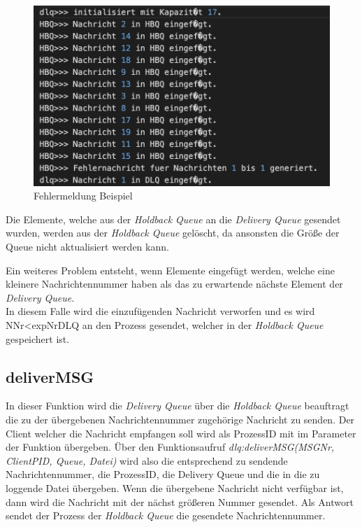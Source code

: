 \begin{figure}[htbp]
\begin{center}
\includegraphics[scale=0.6]{Bilder/BeispielHBQFehler}
\caption{\label{fig:BeispielHBQFehler} Fehlermeldung Beispiel \cite{HBQfehler}} 
\end{center}
\end{figure}

Die Elemente, welche aus der \textit{Holdback Queue} an die \textit{Delivery Queue} gesendet wurden, werden aus der \textit{Holdback Queue} gelöscht, da ansonsten die Größe der Queue nicht aktualisiert werden kann. 

Ein weiteres Problem entsteht, wenn Elemente eingefügt werden, welche eine kleinere Nachrichtennummer haben als das zu erwartende nächste Element der \textit{Delivery Queue}. \\
In diesem Falle wird die einzufügenden Nachricht verworfen und es wird NNr<expNrDLQ an den Prozess gesendet, welcher in der \textit{Holdback Queue} gespeichert ist.

\subsection{deliverMSG}

In dieser Funktion wird die \textit{Delivery Queue} über die \textit{Holdback Queue} beauftragt die zu der übergebenen Nachrichtennummer zugehörige Nachricht zu senden. Der Client welcher die Nachricht empfangen soll wird als ProzessID mit im Parameter der Funktion übergeben. 
Über den Funktionsaufruf \textit{dlq:deliverMSG(MSGNr, ClientPID, Queue, Datei)} wird also die entsprechend zu sendende Nachrichtennummer, die ProzessID, die Delivery Queue und die in die zu loggende Datei übergeben. 
Wenn die übergebene Nachricht nicht verfügbar ist, dann wird die Nachricht mit der nächst größeren Nummer gesendet. 
Als Antwort sendet der Prozess der\textit{ Holdback Queue} die gesendete Nachrichtennummer. 

